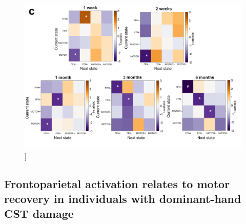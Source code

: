 \documentclass[phd,tocprelim]{cornell}
\renewcommand{\caption}[1]{\singlespacing\hangcaption{#1}\normalspacing}
\begin{document}
\null
\vfill
\clearpage    
    \null
\vfill
\begin{figure}[h!]
		\ContinuedFloat
		\captionsetup{labelformat=adja-page}
    \centering
    \includegraphics[width=1\textwidth]{chapter2/Figure4c.png}
    \caption[]{}
\end{figure}
\null
\vfill



    \subsection*{Frontoparietal activation relates to motor recovery in individuals with dominant-hand CST damage}
    
\end{document}
